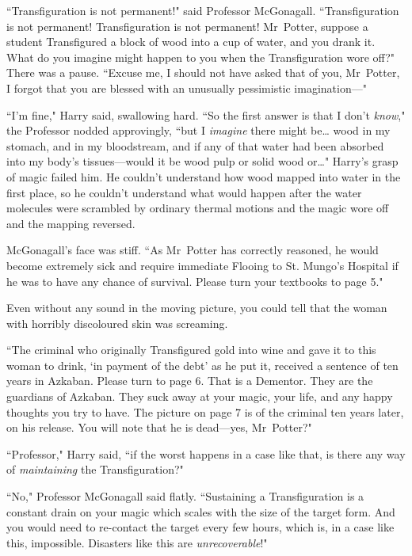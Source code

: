 
``Transfiguration is not permanent!" said Professor McGonagall. ``Transfiguration is not permanent! Transfiguration is not permanent! Mr~Potter, suppose a student Transfigured a block of wood into a cup of water, and you drank it. What do you imagine might happen to you when the Transfiguration wore off?" There was a pause. ``Excuse me, I should not have asked that of you, Mr~Potter, I forgot that you are blessed with an unusually pessimistic imagination—"

``I'm fine," Harry said, swallowing hard. ``So the first answer is that I don't \emph{know}," the Professor nodded approvingly, ``but I \emph{imagine} there might be{\ldots} wood in my stomach, and in my bloodstream, and if any of that water had been absorbed into my body's tissues—would it be wood pulp or solid wood or{\ldots}" Harry's grasp of magic failed him. He couldn't understand how wood mapped into water in the first place, so he couldn't understand what would happen after the water molecules were scrambled by ordinary thermal motions and the magic wore off and the mapping reversed.

McGonagall's face was stiff. ``As Mr~Potter has correctly reasoned, he would become extremely sick and require immediate Flooing to St. Mungo's Hospital if he was to have any chance of survival. Please turn your textbooks to page 5."

Even without any sound in the moving picture, you could tell that the woman with horribly discoloured skin was screaming.

``The criminal who originally Transfigured gold into wine and gave it to this woman to drink, `in payment of the debt' as he put it, received a sentence of ten years in Azkaban. Please turn to page 6. That is a Dementor. They are the guardians of Azkaban. They suck away at your magic, your life, and any happy thoughts you try to have. The picture on page 7 is of the criminal ten years later, on his release. You will note that he is dead—yes, Mr~Potter?"

``Professor," Harry said, ``if the worst happens in a case like that, is there any way of \emph{maintaining} the Transfiguration?"

``No," Professor McGonagall said flatly. ``Sustaining a Transfiguration is a constant drain on your magic which scales with the size of the target form. And you would need to re-contact the target every few hours, which is, in a case like this, impossible. Disasters like this are \emph{unrecoverable}!"

